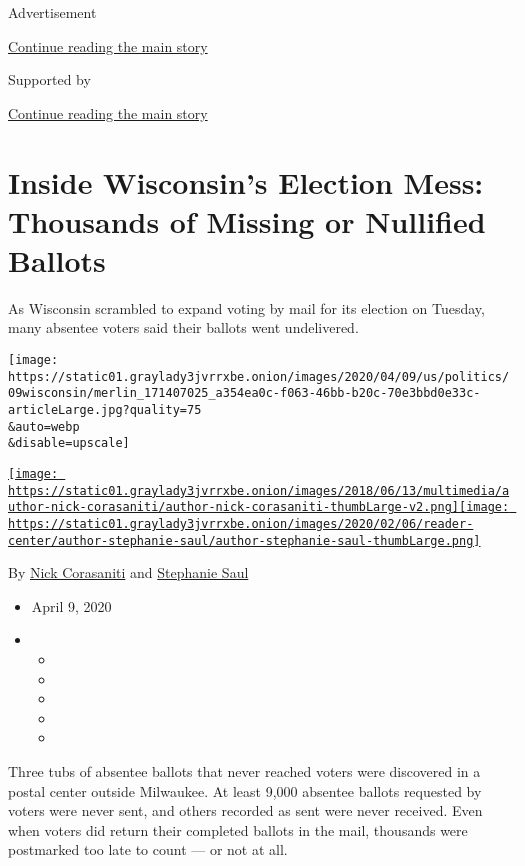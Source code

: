 Advertisement

\protect\hyperlink{after-top}{Continue reading the main story}

Supported by

\protect\hyperlink{after-sponsor}{Continue reading the main story}

\hypertarget{inside-wisconsins-election-mess-thousands-of-missing-or-nullified-ballots}{%
\section{Inside Wisconsin's Election Mess: Thousands of Missing or
Nullified
Ballots}\label{inside-wisconsins-election-mess-thousands-of-missing-or-nullified-ballots}}

As Wisconsin scrambled to expand voting by mail for its election on
Tuesday, many absentee voters said their ballots went undelivered.

\texttt{[image: https://static01.graylady3jvrrxbe.onion/images/2020/04/09/us/politics/09wisconsin/merlin\_171407025\_a354ea0c-f063-46bb-b20c-70e3bbd0e33c-articleLarge.jpg?quality=75\\\&auto=webp\\\&disable=upscale]}

\href{https://www.nytimes3xbfgragh.onion/by/nick-corasaniti}{\texttt{[image: https://static01.graylady3jvrrxbe.onion/images/2018/06/13/multimedia/author-nick-corasaniti/author-nick-corasaniti-thumbLarge-v2.png]}}\href{https://www.nytimes3xbfgragh.onion/by/stephanie-saul}{\texttt{[image: https://static01.graylady3jvrrxbe.onion/images/2020/02/06/reader-center/author-stephanie-saul/author-stephanie-saul-thumbLarge.png]}}

By \href{https://www.nytimes3xbfgragh.onion/by/nick-corasaniti}{Nick
Corasaniti} and
\href{https://www.nytimes3xbfgragh.onion/by/stephanie-saul}{Stephanie
Saul}

\begin{itemize}
\item
  April 9, 2020
\item
  \begin{itemize}
  \item
  \item
  \item
  \item
  \item
  \end{itemize}
\end{itemize}

Three tubs of absentee ballots that never reached voters were discovered
in a postal center outside Milwaukee. At least 9,000 absentee ballots
requested by voters were never sent, and others recorded as sent were
never received. Even when voters did return their completed ballots in
the mail, thousands were postmarked too late to count --- or not at all.

